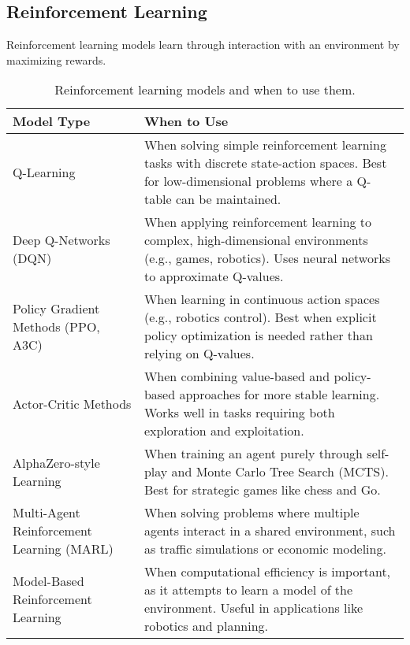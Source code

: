 \documentclass[12pt,openany, draft]{book}
\begin{document}
\subsection{Reinforcement Learning}

Reinforcement learning models learn through interaction with an environment 
by maximizing rewards.

\begin{table}[H]
    \centering
    \small
    \renewcommand{\arraystretch}{1.3} %
    \begin{tabular}{|l|p{8cm}|}
        \hline
        \textbf{Model Type} & \textbf{When to Use} \\
        \hline
        Q-Learning & When solving simple reinforcement learning tasks with discrete state-action spaces. Best for low-dimensional problems where a Q-table can be maintained. \\
        \hline
        Deep Q-Networks (DQN) & When applying reinforcement learning to complex, high-dimensional environments (e.g., games, robotics). Uses neural networks to approximate Q-values. \\
        \hline
        Policy Gradient Methods (PPO, A3C) & When learning in continuous action spaces (e.g., robotics control). Best when explicit policy optimization is needed rather than relying on Q-values. \\
        \hline
        Actor-Critic Methods & When combining value-based and policy-based approaches for more stable learning. Works well in tasks requiring both exploration and exploitation. \\
        \hline
        AlphaZero-style Learning & When training an agent purely through self-play and Monte Carlo Tree Search (MCTS). Best for strategic games like chess and Go. \\
        \hline
        Multi-Agent Reinforcement Learning (MARL) & When solving problems where multiple agents interact in a shared environment, such as traffic simulations or economic modeling. \\
        \hline
        Model-Based Reinforcement Learning & When computational efficiency is important, as it attempts to learn a model of the environment. Useful in applications like robotics and planning. \\
        \hline
    \end{tabular}
    \caption{Reinforcement learning models and when to use them.}
\end{table}
\end{document}
